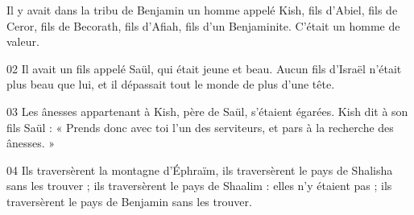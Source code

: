 Il y avait dans la tribu de Benjamin un homme appelé Kish, fils d’Abiel, fils de Ceror, fils de Becorath, fils d’Afiah, fils d’un Benjaminite. C’était un homme de valeur.

02 Il avait un fils appelé Saül, qui était jeune et beau. Aucun fils d’Israël n’était plus beau que lui, et il dépassait tout le monde de plus d’une tête.

03 Les ânesses appartenant à Kish, père de Saül, s’étaient égarées. Kish dit à son fils Saül : « Prends donc avec toi l’un des serviteurs, et pars à la recherche des ânesses. »

04 Ils traversèrent la montagne d’Éphraïm, ils traversèrent le pays de Shalisha sans les trouver ; ils traversèrent le pays de Shaalim : elles n’y étaient pas ; ils traversèrent le pays de Benjamin sans les trouver.
